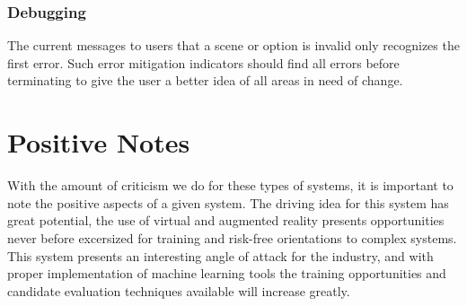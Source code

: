 \documentclass[sigconf]{acmart}
\begin{document}
\subsubsection{Debugging}
The current messages to users that a scene or option is invalid only recognizes the first error. Such error mitigation indicators should find all errors before terminating to give the user a better idea of all areas in need of change.

\section{Positive Notes}
With the amount of criticism we do for these types of systems, it is important to note the positive aspects of a given system. The driving idea for this system has great potential, the use of virtual and augmented reality presents opportunities never before excersized for training and risk-free orientations to complex systems. This system presents an interesting angle of attack for the industry, and with proper implementation of machine learning tools the training opportunities and candidate evaluation techniques available will increase greatly.
\end{document}

